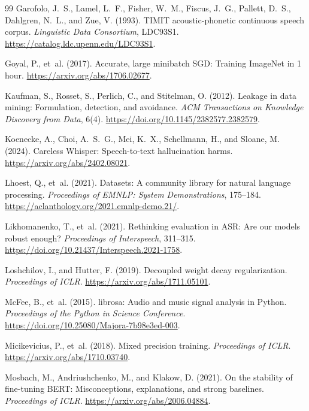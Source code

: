 {\begin{thebibliography}{99}
Garofolo, J.~S., Lamel, L.~F., Fisher, W.~M., Fiscus, J.~G., Pallett, D.~S.,
Dahlgren, N.~L., and Zue, V. (1993). TIMIT acoustic-phonetic continuous speech
corpus. \emph{Linguistic Data Consortium}, LDC93S1.
\url{https://catalog.ldc.upenn.edu/LDC93S1}.

Goyal, P., et~al. (2017). Accurate, large minibatch SGD: Training ImageNet
in 1 hour. \url{https://arxiv.org/abs/1706.02677}.

Kaufman, S., Rosset, S., Perlich, C., and Stitelman, O. (2012).
Leakage in data mining: Formulation, detection, and avoidance.
\emph{ACM Transactions on Knowledge Discovery from Data}, 6(4).
\url{https://doi.org/10.1145/2382577.2382579}.

Koenecke, A., Choi, A.~S.~G., Mei, K.~X., Schellmann, H., and Sloane, M.
(2024). Careless Whisper: Speech-to-text hallucination harms.
\url{https://arxiv.org/abs/2402.08021}.

Lhoest, Q., et~al. (2021). Datasets: A community library for natural language
processing. \emph{Proceedings of EMNLP: System Demonstrations}, 175--184.
\url{https://aclanthology.org/2021.emnlp-demo.21/}.

Likhomanenko, T., et~al. (2021).
Rethinking evaluation in ASR: Are our models robust enough?
\emph{Proceedings of Interspeech}, 311--315.
\url{https://doi.org/10.21437/Interspeech.2021-1758}.

Loshchilov, I., and Hutter, F. (2019). Decoupled weight decay regularization.
\emph{Proceedings of ICLR}. \url{https://arxiv.org/abs/1711.05101}.

McFee, B., et~al. (2015). librosa: Audio and music signal analysis in Python.
\emph{Proceedings of the Python in Science Conference}.
\url{https://doi.org/10.25080/Majora-7b98e3ed-003}.

Micikevicius, P., et~al. (2018). Mixed precision training.
\emph{Proceedings of ICLR}. \url{https://arxiv.org/abs/1710.03740}.

Mosbach, M., Andriushchenko, M., and Klakow, D. (2021).
On the stability of fine-tuning BERT: Misconceptions, explanations, and strong
baselines. \emph{Proceedings of ICLR}.
\url{https://arxiv.org/abs/2006.04884}.


\end{thebibliography}}
